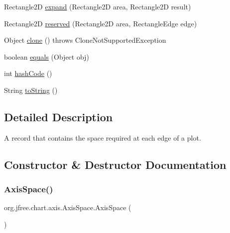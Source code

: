 \begin{DoxyCompactItemize}
\item 
Rectangle2D \mbox{\hyperlink{classorg_1_1jfree_1_1chart_1_1axis_1_1_axis_space_a8270ee0c288a0b29e3997d4c404fb533}{expand}} (Rectangle2D area, Rectangle2D result)
\item 
Rectangle2D \mbox{\hyperlink{classorg_1_1jfree_1_1chart_1_1axis_1_1_axis_space_a5ede3cff673f833262e0726f1abe8cb9}{reserved}} (Rectangle2D area, Rectangle\+Edge edge)
\item 
Object \mbox{\hyperlink{classorg_1_1jfree_1_1chart_1_1axis_1_1_axis_space_af8fbf29a9e04d17ead6506033cf292a3}{clone}} ()  throws Clone\+Not\+Supported\+Exception 
\item 
boolean \mbox{\hyperlink{classorg_1_1jfree_1_1chart_1_1axis_1_1_axis_space_a27a78e96723f5aa5ef605a3f8eb03887}{equals}} (Object obj)
\item 
int \mbox{\hyperlink{classorg_1_1jfree_1_1chart_1_1axis_1_1_axis_space_ad0a2713ab13b161229e65419bcb6db30}{hash\+Code}} ()
\item 
String \mbox{\hyperlink{classorg_1_1jfree_1_1chart_1_1axis_1_1_axis_space_a0016d6845fc167409ae7ec84b294479e}{to\+String}} ()
\end{DoxyCompactItemize}


\subsection{Detailed Description}
A record that contains the space required at each edge of a plot. 

\subsection{Constructor \& Destructor Documentation}
\mbox{\label{classorg_1_1jfree_1_1chart_1_1axis_1_1_axis_space_a66379a469c59cceeb636f86ff9513ee4}} 
\subsubsection{\texorpdfstring{Axis\+Space()}{AxisSpace()}}
{\footnotesize\ttfamily org.\+jfree.\+chart.\+axis.\+Axis\+Space.\+Axis\+Space (\begin{DoxyParamCaption}{ }\end{DoxyParamCaption})}

